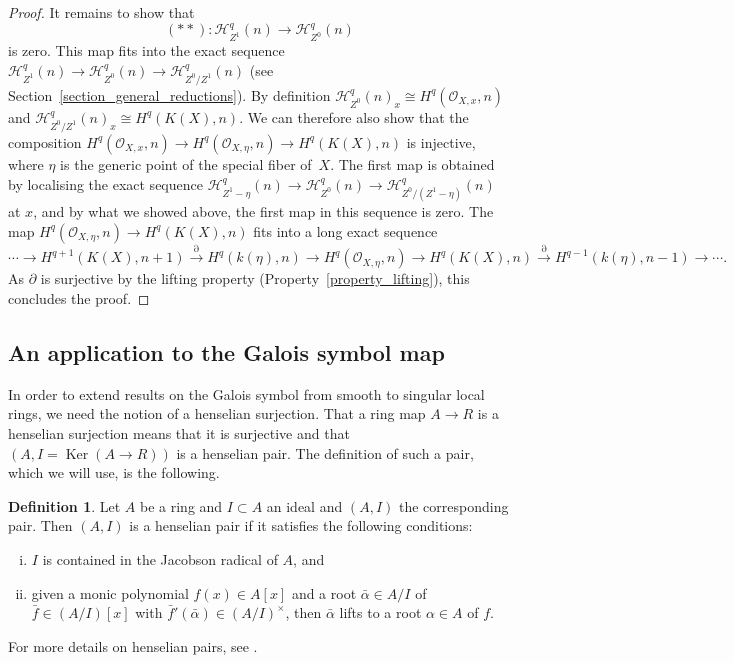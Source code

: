 \documentclass[11pt]{amsart}
\numberwithin{equation}{section}
\newtheorem{Key lemma}[theorem]{Key lemma}
\theoremstyle{definition}
\newtheorem{definition}[theorem]{Definition}
\theoremstyle{remark}
\newcommand{\roi}{\mathcal{O}}
\newcommand{\To}{\longrightarrow}
\newcommand{\cal}{\mathcal}
\renewcommand{\ker}{\operatorname{Ker}}
\newcommand{\xTo}[1]{\stackrel{#1}{\To}}
\begin{document}
\begin{proof}
It remains to show that
$$(**)\colon\cal H^q_{Z^{1}}(n)\To \cal H^q_{Z^0}(n)$$
is zero. This map fits into the exact sequence $\cal H^q_{Z^{1}}(n)\to \cal H^q_{Z^0}(n)\to \cal H^q_{Z^0/Z^1}(n)$ (see Section~\ref{section_general_reductions}). By definition $\cal H^q_{Z^0}(n)_x\cong H^q_{}(\roi_{X,x},n)$ and $\cal H^q_{Z^0/Z^1}(n)_x\cong H^q_{}(K(X),n)$. We can therefore also show that the composition  $ H^q_{}(\roi_{X,x},n)\to H^q_{}(\roi_{X,\eta},n) \to H^q_{}(K(X),n)$ is injective, where $\eta$ is the generic point of the special fiber of~$X$. The first map is obtained by localising the exact sequence $\cal H^q_{Z^1-\eta}(n)\to \cal H^q_{Z^0}(n) \to \cal H^q_{Z^0/(Z^1-\eta)}(n)$ at $x$, and by what we showed above, the first map in this sequence is zero.  
The map $H^q_{}(\roi_{X,\eta},n) \to H^q_{}(K(X),n)$ fits into a long exact sequence
$$\cdots\To H^{q+1}_{}(K(X),n+1)\xTo{\partial} H^{q}_{}(k(\eta),n) \To H^q_{}(\roi_{X,\eta},n) \To H^q_{}(K(X),n)\xTo{\partial}  H^{q-1}_{}(k(\eta),n-1)\To\cdots .$$ 
As $\partial$ is surjective by the lifting property (Property~\ref{property_lifting}), this concludes the proof.
\end{proof}

\subsection{An application to the Galois symbol map}
In order to extend results on the Galois symbol from smooth to singular local rings, we need the notion of a henselian surjection.
That a ring map $A\to R$ is a henselian surjection means that it is surjective and that $(A,I=\ker(A\to R))$ is a henselian pair. The definition of such a pair, which we will use, is the following. 

\begin{definition}  Let $A$ be a ring and $I\subset A$ an ideal and $(A,I)$ the corresponding pair. Then $(A,I)$ is a henselian pair if it satisfies the following conditions:
\begin{enumerate}[(i)]
\item $I$ is contained in the Jacobson radical of $A$, and
\item given a monic polynomial $f(x)\in A[x]$ and a root $\bar\alpha\in A/I$ of $\bar f\in (A/I)[x]$ with $\bar f'(\bar \alpha)\in (A/I)^\times$, then $\bar\alpha$ lifts to a root $\alpha\in A$ of $f$.
\end{enumerate}
\end{definition}

For more details on henselian pairs, see \cite[Tag 09XD]{stacks-project}.
\end{document}
